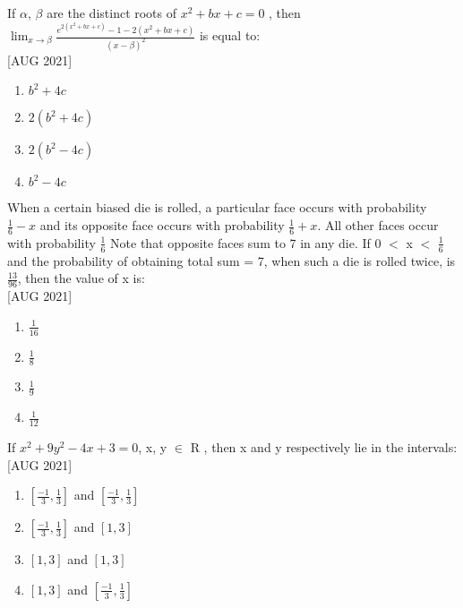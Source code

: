 \iffalse
  \title{Assignment}
  \author{ee24btech11030}
  \section{mcq-single}
\fi

\item If $\alpha$, $\beta$ are the distinct roots of $x^2+ bx + c = 0$ , then $\lim_{x \to \beta}\frac{e^{2(x^2 + bx + c)} - 1 - 2(x^2 + bx + c)}{{(x - \beta)}^2}$ is equal to:  \\ \hfill{[AUG 2021]}
    \begin{multicols}{4}
    \begin{enumerate}
        \item $b^2 + 4c$
        \item $2(b^2 + 4c)$
        \item $2(b^2 - 4c)$
        \item $b^2 - 4c$
    \end{enumerate}
    \end{multicols}
    \item When a certain biased die is rolled, a particular face occurs with probability $\frac{1}{6} - x$ and its opposite face occurs with probability $\frac{1}{6} + x$. All other faces occur with probability $\frac{1}{6}$ Note that opposite faces sum to 7 in any die. If 0 $<$ x $<$ $\frac{1}{6}$ and the probability of obtaining total sum = 7, when such a die is rolled twice, is $\frac{13}{96}$, then the value of x is:  \\\hfill{[AUG 2021]}
    \begin{multicols}{4}
    \begin{enumerate}
        \item $\frac{1}{16}$
        \item $\frac{1}{8}$
        \item $\frac{1}{9}$
        \item $\frac{1}{12}$
    \end{enumerate} 
    \end{multicols}
    \item If $x^2+ 9y^2 - 4x + 3 = 0$, x, y $\in$ R , then x and y respectively lie in the intervals:  \\\hfill{[AUG 2021]}
    \begin{multicols}{2}
    \begin{enumerate}
        \item $\left[\frac{-1}{3},\frac{1}{3}\right]$ and $\left[\frac{-1}{3},\frac{1}{3}\right]$\\
        \item $\left[\frac{-1}{3},\frac{1}{3}\right]$ and $\left[1,3\right]$
        \item $\left[1,3\right]$ and $\left[1,3\right]$\\
        \item $\left[1,3\right]$ and $\left[\frac{-1}{3},\frac{1}{3}\right]$
    \end{enumerate}
    \end{multicols}
